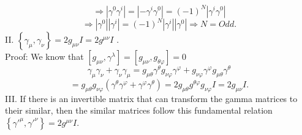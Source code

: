 \documentclass[twocolumn,aps,prb,showpacs]{revtex4-1}
\begin{document}
$$
\Rightarrow
\left|\gamma^{0}\gamma^{i} \right| =\left|-\gamma^{i}\gamma^{0}\right|=(-1)^{N}\left|\gamma^{i}\gamma^{0}\right|
$$
$$
\Rightarrow\left|\gamma^{0}\right|\left|
\gamma^{i} \right|=(-1)^{N}\left|\gamma^{i}\right|\left|\gamma^{0}\right|\Rightarrow N=Odd.
$$
II.	$\left\lbrace \gamma_{\mu},\gamma_{\nu}\right\rbrace  = 2g_{\mu\nu}I=2g^{\mu\nu}I$ . \\
Proof: We know that $[g_{\mu\nu},\gamma^{\lambda}]=[g_{\mu\nu},g_{\theta\varphi}]=0$
$$
\gamma_{\mu}\gamma_{\nu}+\gamma_{\nu}\gamma_{\mu}=g_{\mu\theta}
\gamma^{\theta}g_{\nu\varphi}\gamma^{\varphi}+g_{\nu\varphi}\gamma^{\varphi}
g_{\mu\theta}\gamma^{\theta}$$
$$
=g_{\mu\theta}g_{\nu\varphi}(\gamma^{\theta}\gamma^{\varphi}+\gamma^{\varphi}\gamma^{\theta})=2g_{\mu\theta}g^{\theta\varphi}g_{\nu\varphi}I=2g_{\mu\nu}
I.
$$
III.	If there is an invertible matrix that can transform the gamma matrices to their similar, then the similar matrices follow this fundamental relation $\left\lbrace\gamma'^{\mu},\gamma'^{\nu} \right\rbrace =2g^{\mu\nu}I $.\\ 
\end{document}
